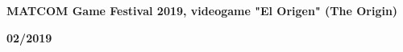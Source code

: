 \begin{minipage}{0.8\textwidth}
    \parbox{0.8\linewidth}{\textbf{MATCOM Game Festival 2019, videogame "El Origen" (The Origin)
    }} \hfill \textbf{02/2019}\\
    \\
\end{minipage}\\